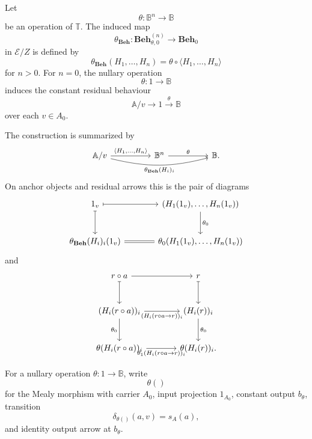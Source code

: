 \begin{definition}
\label{def:pointwise-structured-behaviour}
    Let
    \[
        \theta:\mathbb B^n\to\mathbb B
    \]
    be an operation of \(\mathbb T\). The induced map
    \[
        \theta_{\mathbf{Beh}}:
        \mathbf{Beh}^{(n)}_{\theta,0}\to\mathbf{Beh}_0
    \]
    in \(\mathcal E/Z\) is defined by
    \[
        \theta_{\mathbf{Beh}}(H_1,\dots,H_n)
        =
        \theta\circ\langle H_1,\dots,H_n\rangle
    \]
    for \(n>0\). For \(n=0\), the nullary operation
    \[
        \theta:1\to\mathbb B
    \]
    induces the constant residual behaviour
    \[
        \mathbb A/v\to 1\xrightarrow{\theta}\mathbb B
    \]
    over each \(v\in A_0\).
\end{definition}

The construction is summarized by
\[
\begin{tikzcd}[column sep=huge, row sep=large]
    \mathbb A/v
        \arrow[r, "{\langle H_1,\dots,H_n\rangle}"]
        \arrow[rr, "{\theta_{\mathbf{Beh}}(H_i)_i}"', bend right=14]
    &
    \mathbb B^n
        \arrow[r, "\theta"]
    &
    \mathbb B .
\end{tikzcd}
\]
On anchor objects and residual arrows this is the pair of diagrams
\[
\begin{tikzcd}[column sep=large, row sep=large]
    1_v
        \arrow[r, maps to]
        \arrow[d, maps to]
    &
    (H_1(1_v),\dots,H_n(1_v))
        \arrow[d, "\theta_0"]
    \\
    \theta_{\mathbf{Beh}}(H_i)_i(1_v)
        \arrow[r, equal]
    &
    \theta_0(H_1(1_v),\dots,H_n(1_v))
\end{tikzcd}
\]
and
\[
\begin{tikzcd}[column sep=large, row sep=large]
    r\circ a
        \arrow[r]
        \arrow[d, maps to]
    &
    r
        \arrow[d, maps to]
    \\
    (H_i(r\circ a))_i
        \arrow[r, "{(H_i(r\circ a\to r))_i}"']
        \arrow[d, "\theta_0"']
    &
    (H_i(r))_i
        \arrow[d, "\theta_0"]
    \\
    \theta(H_i(r\circ a))_i
        \arrow[r, "{\theta_1(H_i(r\circ a\to r))_i}"']
    &
    \theta(H_i(r))_i .
\end{tikzcd}
\]

For a nullary operation \(\theta:1\to\mathbb B\), write
\[
    \theta()
\]
for the Mealy morphism with carrier \(A_0\), input projection \(1_{A_0}\),
constant output \(b_\theta\), transition
\[
    \delta_{\theta()}(a,v)=s_A(a),
\]
and identity output arrow at \(b_\theta\).

